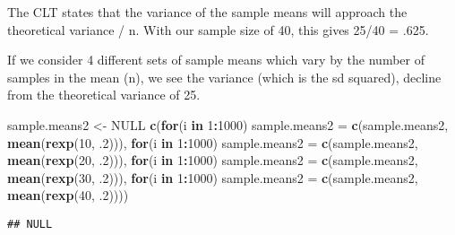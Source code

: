 \documentclass[]{article}
\newenvironment{Shaded}{\begin{snugshade}}{\end{snugshade}}
\newcommand{\KeywordTok}[1]{\textcolor[rgb]{0.13,0.29,0.53}{\textbf{#1}}}
\newcommand{\DataTypeTok}[1]{\textcolor[rgb]{0.13,0.29,0.53}{#1}}
\newcommand{\DecValTok}[1]{\textcolor[rgb]{0.00,0.00,0.81}{#1}}
\newcommand{\StringTok}[1]{\textcolor[rgb]{0.31,0.60,0.02}{#1}}
\newcommand{\OtherTok}[1]{\textcolor[rgb]{0.56,0.35,0.01}{#1}}
\newcommand{\ControlFlowTok}[1]{\textcolor[rgb]{0.13,0.29,0.53}{\textbf{#1}}}
\newcommand{\OperatorTok}[1]{\textcolor[rgb]{0.81,0.36,0.00}{\textbf{#1}}}
\newcommand{\NormalTok}[1]{#1}
\begin{document}
The CLT states that the variance of the sample means will approach the
theoretical variance / n. With our sample size of 40, this gives 25/40 =
.625.

If we consider 4 different sets of sample means which vary by the number
of samples in the mean (n), we see the variance (which is the sd
squared), decline from the theoretical variance of 25.

\begin{Shaded}
\begin{Highlighting}[]
\NormalTok{sample.means2 <-}\StringTok{ }\OtherTok{NULL}
\KeywordTok{c}\NormalTok{(}\ControlFlowTok{for}\NormalTok{(i }\ControlFlowTok{in} \DecValTok{1}\OperatorTok{:}\DecValTok{1000}\NormalTok{) }\DataTypeTok{sample.means2 =} \KeywordTok{c}\NormalTok{(sample.means2, }\KeywordTok{mean}\NormalTok{(}\KeywordTok{rexp}\NormalTok{(}\DecValTok{10}\NormalTok{, .}\DecValTok{2}\NormalTok{))),}
  \ControlFlowTok{for}\NormalTok{(i }\ControlFlowTok{in} \DecValTok{1}\OperatorTok{:}\DecValTok{1000}\NormalTok{) }\DataTypeTok{sample.means2 =} \KeywordTok{c}\NormalTok{(sample.means2, }\KeywordTok{mean}\NormalTok{(}\KeywordTok{rexp}\NormalTok{(}\DecValTok{20}\NormalTok{, .}\DecValTok{2}\NormalTok{))),}
  \ControlFlowTok{for}\NormalTok{(i }\ControlFlowTok{in} \DecValTok{1}\OperatorTok{:}\DecValTok{1000}\NormalTok{) }\DataTypeTok{sample.means2 =} \KeywordTok{c}\NormalTok{(sample.means2, }\KeywordTok{mean}\NormalTok{(}\KeywordTok{rexp}\NormalTok{(}\DecValTok{30}\NormalTok{, .}\DecValTok{2}\NormalTok{))),}
  \ControlFlowTok{for}\NormalTok{(i }\ControlFlowTok{in} \DecValTok{1}\OperatorTok{:}\DecValTok{1000}\NormalTok{) }\DataTypeTok{sample.means2 =} \KeywordTok{c}\NormalTok{(sample.means2, }\KeywordTok{mean}\NormalTok{(}\KeywordTok{rexp}\NormalTok{(}\DecValTok{40}\NormalTok{, .}\DecValTok{2}\NormalTok{))))}
\end{Highlighting}
\end{Shaded}

\begin{verbatim}
## NULL
\end{verbatim}
\end{document}
